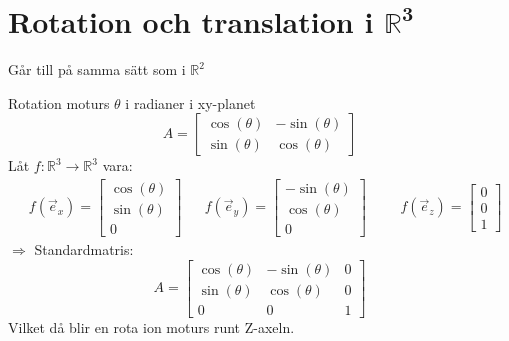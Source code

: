 \section{Rotation och translation i $\mathbf{\mathbb{R}^3}$} %
\label{sec:rotation_och_translation_i_}
Går till på samma sätt som i $\mathbb{R}^2$
\begin{Ex}
    Rotation moturs $\theta$ i radianer i xy-planet
    \[
        A = \begin{bmatrix} \cos(\theta)&-\sin(\theta)\\\sin(\theta)&\cos(\theta) \end{bmatrix}
    \]
    Låt $f: \mathbb{R}^3 \rightarrow \mathbb{R}^3$ vara:
    \begin{align*}
    &f(\vec{e}_x) = \begin{bmatrix} \cos(\theta)\\\sin(\theta)\\0 \end{bmatrix}
    &&f(\vec{e}_y) = \begin{bmatrix} -\sin(\theta)\\\cos(\theta)\\0 \end{bmatrix}
    &&&f(\vec{e}_z) = \begin{bmatrix} 0\\0\\1 \end{bmatrix}
    \end{align*}
    $\Rightarrow$ Standardmatris:
    \[
        A = \begin{bmatrix} \cos(\theta)&-\sin(\theta)&0\\\sin(\theta)&\cos(\theta)&0\\0&0&1 \end{bmatrix}
    \]
    Vilket då blir en rota ion moturs runt Z-axeln.
\end{Ex}



